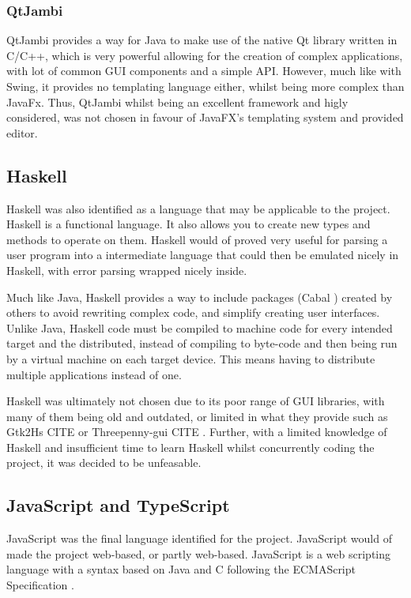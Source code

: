 \subsubsection{QtJambi}
QtJambi \cite{omixvisualization_2023_omixvisualizationqtjambi} provides a way for Java to make use of the native Qt library written in C/C++, which is very powerful allowing for the creation of complex applications, with lot of common GUI components and a simple API. However, much like with Swing, it provides no templating language either, whilst being more complex than JavaFx. Thus, QtJambi whilst being an excellent framework and higly considered, was not chosen in favour of JavaFX's templating system and provided editor.

\subsection{Haskell}
Haskell \cite{marlow_2010_haskell} was also identified as a language that may be applicable to the project. Haskell is a functional language. It also allows you to create new types and methods to operate on them. Haskell would of proved very useful for parsing a user program into a intermediate language that could then be emulated nicely in Haskell, with error parsing wrapped nicely inside.

Much like Java, Haskell provides a way to include packages (Cabal \cite{haskell_2023_the}) created by others to avoid rewriting complex code, and simplify creating user interfaces. Unlike Java, Haskell code must be compiled to machine code for every intended target and the distributed, instead of compiling to byte-code and then being run by a virtual machine on each target device. This means having to distribute multiple applications instead of one.

Haskell was ultimately not chosen due to its poor range of GUI libraries, with many of them being old and outdated, or limited in what they provide such as Gtk2Hs \cite{haskell_2023_gtk2hs} CITE or Threepenny-gui \cite{threepennygui_2017_about} CITE . Further, with a limited knowledge of Haskell and insufficient time to learn Haskell whilst concurrently coding the project, it was decided to be unfeasable.

\subsection{JavaScript and TypeScript}
JavaScript was the final language identified for the project. JavaScript would of made the project web-based, or partly web-based. JavaScript is a web scripting language with a syntax based on Java and C following the ECMAScript Specification \cite{ecmainternational_2023_ecmascript}.

